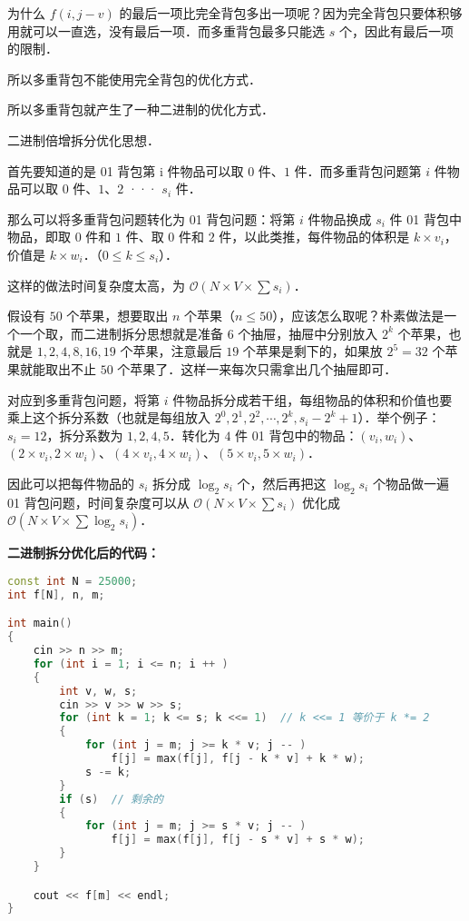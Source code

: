 为什么 $f(i, j - v)$ 的最后一项比完全背包多出一项呢？因为完全背包只要体积够用就可以一直选，没有最后一项．而多重背包最多只能选 $s$ 个，因此有最后一项的限制．

所以多重背包不能使用完全背包的优化方式．

所以多重背包就产生了一种二进制的优化方式．

二进制倍增拆分优化思想．

首先要知道的是 01 背包第 i 件物品可以取 $0$ 件、$1$ 件．而多重背包问题第 $i$ 件物品可以取 $0$ 件、$1$、$2$ ··· $s_i$ 件．

那么可以将多重背包问题转化为 01 背包问题：将第 $i$ 件物品换成 $s_i$ 件 01 背包中物品，即取 $0$ 件和 $1$ 件、取 $0$ 件和 $2$ 件，以此类推，每件物品的体积是 $k \times v_i$，价值是 $k \times w_i$．（$0 \leq k \leq s_i$）．

这样的做法时间复杂度太高，为 $\mathcal{O}(N \times V \times \sum s_i)$．

假设有 $50$ 个苹果，想要取出 $n$ 个苹果（$n \leq 50$），应该怎么取呢？朴素做法是一个一个取，而二进制拆分思想就是准备 $6$ 个抽屉，抽屉中分别放入 $2^k$ 个苹果，也就是 $1, 2, 4, 8, 16, 19$ 个苹果，注意最后 $19$ 个苹果是剩下的，如果放 $2^5 = 32$ 个苹果就能取出不止 $50$ 个苹果了．这样一来每次只需拿出几个抽屉即可．

对应到多重背包问题，将第 $i$ 件物品拆分成若干组，每组物品的体积和价值也要乘上这个拆分系数（也就是每组放入 $2^0, 2^1, 2^2, \cdots , 2^k, s_i - 2^k + 1$）．举个例子：$s_i = 12$，拆分系数为 $1, 2, 4, 5$．转化为 $4$ 件 01 背包中的物品：$(v_i, w_i)$、$(2 \times v_i, 2 \times w_i)$、$(4 \times v_i, 4 \times w_i)$、$(5 \times v_i, 5 \times w_i)$．

因此可以把每件物品的 $s_i$ 拆分成 $\log_2 s_i$ 个，然后再把这 $\log_2 s_i$ 个物品做一遍 01 背包问题，时间复杂度可以从 $\mathcal{O}(N \times V \times \sum s_i)$ 优化成 $\mathcal{O}(N \times V \times \sum \log_2 s_i)$．

\textbf{二进制拆分优化后的代码：}

\begin{lstlisting}[language=cpp]
const int N = 25000;
int f[N], n, m;

int main()
{
    cin >> n >> m;
    for (int i = 1; i <= n; i ++ ) 
    {
        int v, w, s;
        cin >> v >> w >> s;
        for (int k = 1; k <= s; k <<= 1)  // k <<= 1 等价于 k *= 2
        {
            for (int j = m; j >= k * v; j -- )
                f[j] = max(f[j], f[j - k * v] + k * w);
            s -= k;
        }
        if (s)  // 剩余的
        {
            for (int j = m; j >= s * v; j -- )
                f[j] = max(f[j], f[j - s * v] + s * w);
        }
    }

    cout << f[m] << endl;
}
\end{lstlisting}

